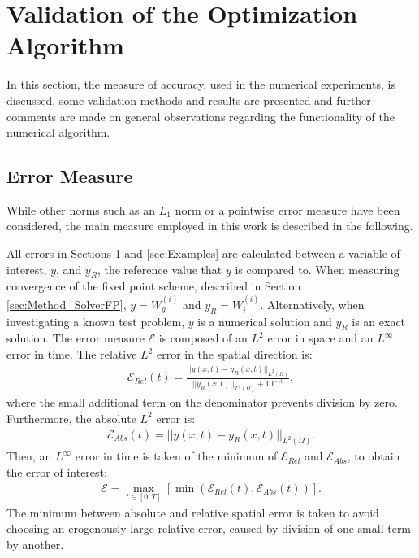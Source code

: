 \documentclass[11pt, a4paper]{article}
\theoremstyle{definition}
\begin{document}
\section{Validation of the Optimization Algorithm} \label{sec:Validation}
In this section, the measure of accuracy, used in the numerical experiments, is discussed, some validation methods and results are presented and further comments are made on general observations regarding the functionality of the numerical algorithm.
\subsection{Error Measure}\label{sec:ErrorMeasure}
While other norms such as an $L_1$ norm or a pointwise error measure have been considered, the main measure employed in this work is described in the following.

All errors in Sections \ref{sec:Validation} and \ref{sec:Examples} are calculated between a variable of interest, $y$, and $y_R$, the reference value that $y$ is compared to. When measuring convergence of the fixed point scheme, described in Section \ref{sec:Method_SolverFP}, $y = W^{(i)}_g$ and $y_R = W^{(i)}_i$. Alternatively, when investigating a known test problem, $y$ is a numerical solution and $y_R$ is an exact solution. The error measure $\mathcal{E}$ is composed of an $L^2$ error in space and an $L^\infty$ error in time. The relative $L^2$ error in the spatial direction is:
\begin{align*}
\mathcal{E}_{Rel}(t) = \frac{|| y(x,t) - y_{R}(x,t)||_{L^2(\Omega)} }{||y_R(x,t) ||_{L^2(\Omega)}+ 10^{-10}},
\end{align*}
where the small additional term on the denominator prevents division by zero.
Furthermore, the absolute $L^2$ error is:
\begin{align*}
\mathcal{E}_{Abs}(t) = || y(x,t) - y_R(x,t)||_{L^2(\Omega)}.
\end{align*}
Then, an $L^\infty$ error in time is taken of the minimum of $\mathcal{E}_{Rel}$ and $\mathcal{E}_{Abs}$, to obtain the error of interest:
\begin{align*}
\mathcal{E} = \max_{t \in [0,T]}\left[\min\left(\mathcal{E}_{Rel}(t), \mathcal{E}_{Abs}(t)\right)\right].
\end{align*}
The minimum between absolute and relative spatial error is taken to avoid choosing an erogenously large relative error, caused by division of one small term by another.
\end{document}
